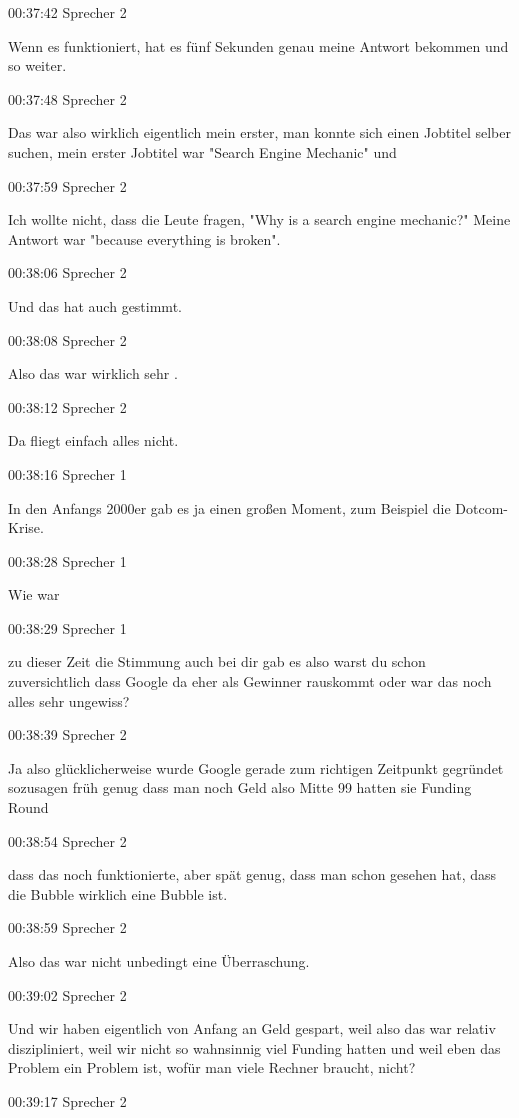 00:37:42 Sprecher 2

Wenn es funktioniert, hat es fünf Sekunden genau meine Antwort bekommen
und so weiter.

00:37:48 Sprecher 2

Das war also wirklich eigentlich mein erster, man konnte sich einen
Jobtitel selber suchen, mein erster Jobtitel war "Search Engine
Mechanic" und

00:37:59 Sprecher 2

Ich wollte nicht, dass die Leute fragen, "Why is a search engine
mechanic?" Meine Antwort war "because everything is broken".

00:38:06 Sprecher 2

Und das hat auch gestimmt.

00:38:08 Sprecher 2

Also das war wirklich sehr .

00:38:12 Sprecher 2

Da fliegt einfach alles nicht.

00:38:16 Sprecher 1

In den Anfangs 2000er gab es ja einen großen Moment, zum Beispiel die
Dotcom-Krise.

00:38:28 Sprecher 1

Wie war

00:38:29 Sprecher 1

zu dieser Zeit die Stimmung auch bei dir gab es also warst du schon
zuversichtlich dass Google da eher als Gewinner rauskommt oder war das
noch alles sehr ungewiss?

00:38:39 Sprecher 2

Ja also glücklicherweise wurde Google gerade zum richtigen Zeitpunkt
gegründet sozusagen früh genug dass man noch Geld also Mitte 99 hatten
sie Funding Round

00:38:54 Sprecher 2

dass das noch funktionierte, aber spät genug, dass man schon gesehen
hat, dass die Bubble wirklich eine Bubble ist.

00:38:59 Sprecher 2

Also das war nicht unbedingt eine Überraschung.

00:39:02 Sprecher 2

Und wir haben eigentlich von Anfang an Geld gespart, weil also das war
relativ diszipliniert, weil wir nicht so wahnsinnig viel Funding hatten
und weil eben das Problem ein Problem ist, wofür man viele Rechner
braucht, nicht?

00:39:17 Sprecher 2

